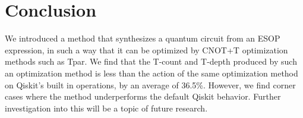 \section{Conclusion}
We introduced a method that synthesizes a quantum circuit from an ESOP expression, in such a way that
it can be optimized by CNOT+T optimization methods such as Tpar. We find that the T-count
and T-depth produced by such an optimization method is less than the action of the same optimization
method on Qiskit's built in operations, by an average of 36.5\%. However, we find corner cases where
the method underperforms the default Qiskit behavior. Further investigation into this will be a topic of
future research.
\label{Conc}

